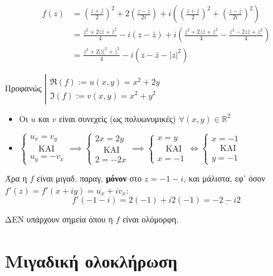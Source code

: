 \documentclass[12pt,a4paper,notitlepage,fleqn]{article}
\begin{document}
\begin{enumroman}
		\begin{align*}
			f(z) &= \left(\frac{z+\bar z}{2}\right)^2+2\left(\frac{z-\bar z}{2i}\right)
			+i\left(\left(\frac{z+\bar z}{2}\right)^2+\left(\frac{z-\bar z}{2i}\right)^2\right)
			\\ &= \frac{z^2+2z\bar z+\bar z^2}{4}-
			i\left(z-\bar z\right)+i\left(\frac{z^2+2z\bar z+\bar z^2}{4}
			-\frac{z^2-2z\bar z+z^2}{4}\right)
			\\ &= \frac{z^2+2|z|^2+\bar z^2}{4}-i\left(
			z-\bar z-|z|^2
			\right)
		\end{align*}
		\item Προφανώς
		\(
		\left|
		\begin{array}{l}
		\Re(f) := u(x,y) = x^2+2y \\
		\Im(f) := v(x,y) = x^2+y^2
		\end{array}
		 \right.
		 \)
		 \begin{itemize}
		 	\item Οι \( u \) και \( v \) είναι συνεχείς (ως πολυωνυμικές) \( \forall
		 	(x,y)\in\mathbb R^2
		 	 \)
		 	\item
		 	\(
		 	\begin{cases}
		 	u_x=v_y \\ \quad\text{ΚΑΙ} \\ u_y=-v_x
		 	\end{cases} \implies \begin{cases}
		 	2x=2y\\ \quad\text{ΚΑΙ} \\ 2=-2x
		 	\end{cases} \implies \begin{cases}
		 	x=y \\ \quad \text{ΚΑΙ} \\ x = -1
		 	\end{cases} \iff \begin{cases}
		 	x=-1 \\ \quad\text{ΚΑΙ} \\ y=-1
		 	\end{cases}
		 	 \)
		 \end{itemize}
		 Άρα η \( f \) είναι μιγαδ. παραγ. \textbf{μόνον} στο \( \boxed{z=-1-i} \),
		 και μάλιστα, εφ' όσον \( f'(z)=f'(x+iy)=u_x+iv_x \):
		 \[
		 f'(-1-i) = 2(-1)+i2(-1) = \underline{-2-i2}
		 \]
		 \item ΔΕΝ υπάρχουν σημεία όπου η \( f \) είναι ολόμορφη.
	\end{enumroman}

	\section{Μιγαδική ολοκλήρωση}
\end{document}
